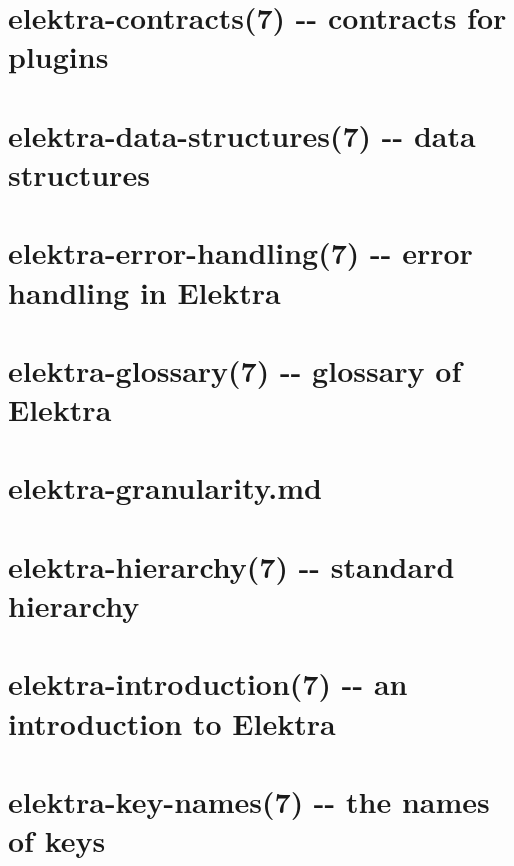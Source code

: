 \documentclass[twoside]{book}
\newcommand{\+}{\discretionary{\mbox{\scriptsize$\hookleftarrow$}}{}{}}
\begin{document}
\chapter{elektra-\/contracts(7) -\/-\/ contracts for plugins}
\label{md_doc_help_elektra-contracts}
\hypertarget{md_doc_help_elektra-contracts}{}

\chapter{elektra-\/data-\/structures(7) -\/-\/ data structures}
\label{md_doc_help_elektra-data-structures}
\hypertarget{md_doc_help_elektra-data-structures}{}

\chapter{elektra-\/error-\/handling(7) -\/-\/ error handling in Elektra}
\label{md_doc_help_elektra-error-handling}
\hypertarget{md_doc_help_elektra-error-handling}{}

\chapter{elektra-\/glossary(7) -\/-\/ glossary of Elektra}
\label{md_doc_help_elektra-glossary}
\hypertarget{md_doc_help_elektra-glossary}{}

\chapter{elektra-\/granularity.md}
\label{doc_help_elektra-granularity_md}
\hypertarget{doc_help_elektra-granularity_md}{}

\chapter{elektra-\/hierarchy(7) -\/-\/ standard hierarchy}
\label{md_doc_help_elektra-hierarchy}
\hypertarget{md_doc_help_elektra-hierarchy}{}

\chapter{elektra-\/introduction(7) -\/-\/ an introduction to Elektra}
\label{md_doc_help_elektra-introduction}
\hypertarget{md_doc_help_elektra-introduction}{}

\chapter{elektra-\/key-\/names(7) -\/-\/ the names of keys}
\label{md_doc_help_elektra-key-names}
\hypertarget{md_doc_help_elektra-key-names}{}

\end{document}
